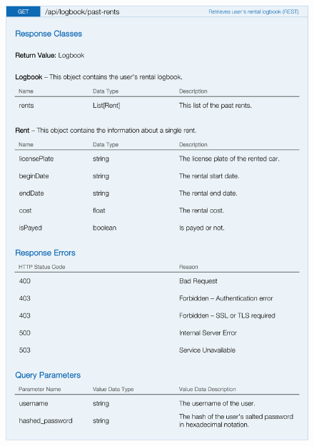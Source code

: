 \begin{figure}[H]
	\noindent
    	\centering
    	\includegraphics{apitables/APIPastRents.png}
    	\label{fig:api-past-rents}
\end{figure}